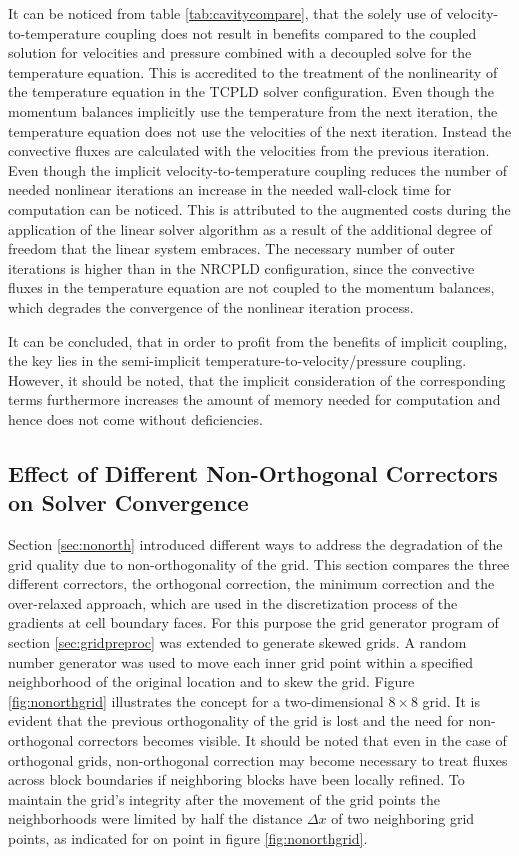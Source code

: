 It can be noticed from table \ref{tab:cavitycompare}, that the solely use of velocity-to-temperature coupling does not result in benefits compared to the coupled solution for velocities and pressure combined with a decoupled solve for the temperature equation. This is accredited to the treatment of the nonlinearity of the temperature equation in the TCPLD solver configuration. Even though the momentum balances implicitly use the temperature from the next iteration, the temperature equation does not use the velocities of the next iteration. Instead the convective fluxes are calculated with the velocities from the previous iteration. Even though the implicit velocity-to-temperature coupling reduces the number of needed nonlinear iterations an increase in the needed wall-clock time for computation can be noticed. This is attributed to the augmented costs during the application of the linear solver algorithm as a result of the additional degree of freedom that the linear system embraces. The necessary number of outer iterations is higher than in the NRCPLD configuration, since the convective fluxes in the temperature equation are not coupled to the momentum balances, which degrades the convergence of the nonlinear iteration process.

It can be concluded, that in order to profit from the benefits of implicit coupling, the key lies in the semi-implicit temperature-to-velocity/pressure coupling. However, it should be noted, that the implicit consideration of the corresponding terms furthermore increases the amount of memory needed for computation and hence does not come without deficiencies.

\subsection{Effect of Different Non-Orthogonal Correctors on Solver Convergence}
\label{sec:studynonorth}

Section \ref{sec:nonorth} introduced different ways to address the degradation of the grid quality due to non-orthogonality of the grid. This section compares the three different correctors, the orthogonal correction, the minimum correction and the over-relaxed approach, which are used in the discretization process of the gradients at cell boundary faces. For this purpose the grid generator program of section \ref{sec:gridpreproc} was extended to generate skewed grids. A random number generator was used to move each inner grid point within a specified neighborhood of the original location and to skew the grid. Figure \ref{fig:nonorthgrid} illustrates the concept for a two-dimensional \(8 \times 8\) grid. It is evident that the previous orthogonality of the grid is lost and the need for non-orthogonal correctors becomes visible. It should be noted that even in the case of orthogonal grids, non-orthogonal correction may become necessary to treat fluxes across block boundaries if neighboring blocks have been locally refined. To maintain the grid's integrity after the movement of the grid points the neighborhoods were limited by half the distance \(\Delta x\) of two neighboring grid points, as indicated for on point in figure \ref{fig:nonorthgrid}.


